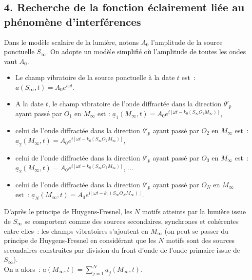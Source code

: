 \documentclass{article}
\begin{document}
\subsection*{4.  Recherche de la fonction éclairement liée au
phénomène d'interférences} Dans le modèle scalaire de la
lumière, notons $A_{0}$ l'amplitude de la source ponctuelle
$S_{\mathrm{\infty}}$. On adopte un modèle simplifié où l'amplitude de toutes
les ondes vaut $A_{0}$.
\begin{itemize}
\item Le champ vibratoire de la source ponctuelle à la date $t$ est :
$\underline{a}\left(S_{\mathrm{\infty}},t\right) = A_{0}e^{i\omega t}$.
\item A la date $t$, le champ vibratoire de l'onde diffractée dans la
direction $\theta'_{p}$ ayant passé par $O_{1}$ en $M_{\mathrm{\infty}}$ est
: $\underline{a}_{1}\left(M_{\mathrm{\infty}},t\right) = A_{0}e^{i\left[\omega
t-k_{0}\left(S_{\mathrm{\infty}}O_{1}M_{\mathrm{\infty}}\right)\right]}$,
\item celui de l'onde diffractée dans la direction $\theta'_{p}$ ayant
passé par $O_{2}$ en $M_{\mathrm{\infty}}$ est :
$\underline{a}_{2}\left(M_{\mathrm{\infty}},t\right) = A_{0}e^{i\left[\omega
t-k_{0}\left(S_{\mathrm{\infty}}O_{2}M_{\mathrm{\infty}}\right)\right]}$,
\item celui de l'onde diffractée dans la direction $\theta'_{p}$ ayant
passé par $O_{3}$ en $M_{\mathrm{\infty}}$ est :
$\underline{a}_{2}\left(M_{\mathrm{\infty}},t\right) = A_{0}e^{i\left[\omega
t-k_{0}\left(S_{\mathrm{\infty}}O_{3}M_{\mathrm{\infty}}\right)\right]}$, ...
\item celui de l'onde diffractée dans la direction $\theta'_{p}$ ayant
passé par $O_{N}$ en $M_{\mathrm{\infty}}$ est :
$\underline{a}_{N}\left(M_{\mathrm{\infty}},t\right) = A_{0}e^{i\left[\omega
t-k_{0}\left(S_{\mathrm{\infty}}O_{N}M_{\mathrm{\infty}}\right)\right]}$.
\end{itemize}
D'après le principe de Huygens-Fresnel, les $N$ motifs atteints par
la lumière issue de $S_{\mathrm{\infty}}$ se comportent comme des sources
secondaires, synchrones et cohérentes entre elles : les champs
vibratoires s'ajoutent en $M_{\mathrm{\infty}}$ (on peut se passer du
principe de Huygens-Fresnel en considérant que les $N$ motifs sont
des sources secondaires construites par division du front d'onde de
l'onde primaire issue de $S_{\mathrm{\infty}}$). \\
On a alors : $\underline{a}\left(M_{\mathrm{\infty}},t\right) =
\sum_{j=1}^{N}\underline{a}_{j}\left(M_{\mathrm{\infty}},t\right)$. \\
\end{document}
